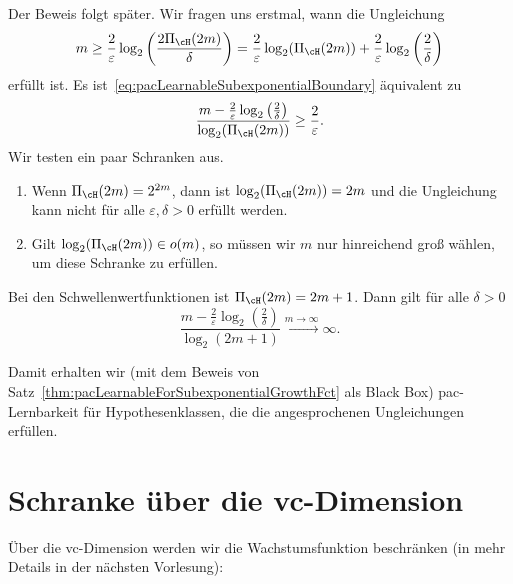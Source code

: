 \documentclass[language=ngerman,algolist,acrolist]{TemplateLecture}
\begin{document}
Der Beweis folgt später. Wir fragen uns erstmal, wann die Ungleichung
\begin{equation}
    m \geq \frac{2}{\varepsilon} \log_2\left( \frac{2\Pi_\cH(2m)}{\delta} \right) = \frac{2}{\varepsilon} \log_2(\Pi_\cH(2m)) + \frac{2}{\varepsilon}\log_2\left( \frac{2}{\delta} \right)\label{eq:pacLearnableSubexponentialBoundary}
\end{equation}
erfüllt ist. Es ist~\eqref{eq:pacLearnableSubexponentialBoundary} äquivalent zu 
\begin{equation*}
    \frac{m - \frac{2}{\varepsilon}\log_2\left( \frac{2}{\delta} \right)}{\log_2(\Pi_\cH(2m))} \geq \frac{2}{\varepsilon}.
\end{equation*}
Wir testen ein paar Schranken aus.
\begin{enumerate}[$(a)$]
    \item Wenn $\Pi_\cH(2m) = 2^{2m}$, dann ist $\log_2(\Pi_\cH(2m)) = 2m$ und die Ungleichung kann nicht für alle $\varepsilon, \delta > 0$ erfüllt werden.
    \item Gilt $\log_2(\Pi_\cH(2m)) \in o(m)$, so müssen wir $m$ nur hinreichend groß wählen, um diese Schranke zu erfüllen. 
\end{enumerate}
\begin{expl}
    Bei den Schwellenwertfunktionen ist $\Pi_\cH(2m) = 2m + 1$. Dann gilt für alle $\delta > 0$
    \begin{equation*}
        \frac{m - \frac{2}{\varepsilon}\log_2\left( \frac{2}{\delta} \right)}{\log_2(2m + 1)} \overset{m \to \infty}{\longrightarrow} \infty.
    \end{equation*}
\end{expl}
Damit erhalten wir (mit dem Beweis von Satz~\ref{thm:pacLearnableForSubexponentialGrowthFct} als Black Box) \ac{pac}-Lernbarkeit für Hypothesenklassen, die die angesprochenen Ungleichungen erfüllen.

\section{Schranke über die \acs{vc}-Dimension}
Über die \acf{vc}-Dimension werden wir die Wachstumsfunktion beschränken (in mehr Details in der nächsten Vorlesung):
\end{document}
